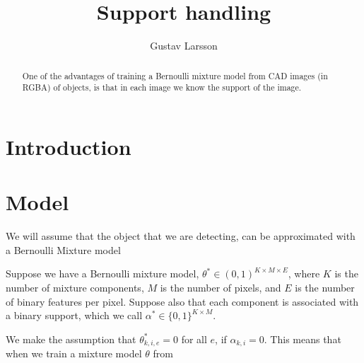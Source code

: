 \documentclass{report}
\begin{document}
\title{Support handling}

\author{Gustav Larsson}

\maketitle

\begin{abstract}
One of the advantages of training a Bernoulli mixture model from CAD images (in RGBA) of objects, is that in each image we know the support of the image.
%
%
\end{abstract}
%

\section{Introduction}

\section{Model}
We will assume that the object that we are detecting, can be approximated with a Bernoulli Mixture model 

Suppose we have a Bernoulli mixture model, $\theta^* \in (0, 1)^{K \times M \times E}$, where $K$ is the number of mixture components, $M$ is the number of pixels, and $E$ is the number of binary features per pixel. Suppose also that each component is associated with a binary support, which we call $\alpha^* \in \{0, 1\}^{K \times M}$.

We make the assumption that $\theta^*_{k,i,e} = 0$ for all $e$, if $\alpha_{k,i} = 0$. This means that when we train a mixture model $\theta$ from 
\end{document}
